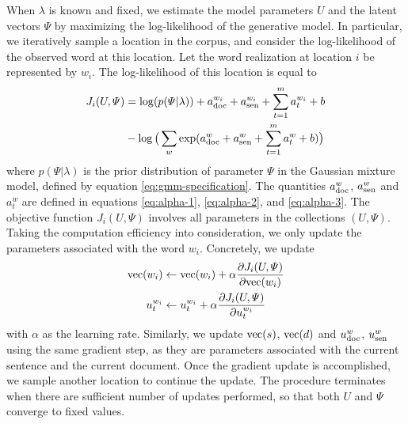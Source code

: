 \documentclass[english,letter]{article}
\renewcommand\[{\begin{equation}}
\renewcommand\]{\end{equation}}
\begin{document}
When $\lambda$ is known and fixed, we estimate the model parameters
$U$ and the latent vectors $\varPsi$ by maximizing the log-likelihood
of the generative model. In particular, we iteratively sample a location
in the corpus, and consider the log-likelihood of the observed word
at this location. Let the word realization at location $i$ be represented
by $w_{i}$. The log-likelihood of this location is equal to
\begin{align}
J_{i}(U,\varPsi) & =\log(p(\varPsi|\lambda))+a_{{\rm doc}}^{w_{i}}+a_{{\rm sen}}^{w_{i}}+\sum_{t=1}^{m}a_{t}^{w_{i}}+b\nonumber \\
 & -\log\big(\sum_{w}\exp(a_{{\rm doc}}^{w}+a_{{\rm sen}}^{w}+\sum_{t=1}^{m}a_{t}^{w}+b)\big)
\end{align}
where $p(\varPsi|\lambda)$ is the prior distribution of parameter
$\varPsi$ in the Gaussian mixture model, defined by equation \eqref{eq:gmm-specification}.
The quantities $a_{{\rm doc}}^{w}$, $a_{{\rm sen}}^{w}$ and $a_{t}^{w}$
are defined in equations \eqref{eq:alpha-1}, \eqref{eq:alpha-2},
and \eqref{eq:alpha-3}. The objective function $J_{i}(U,\varPsi)$
involves all parameters in the collections $(U,\varPsi)$. Taking
the computation efficiency into consideration, we only update the
parameters associated with the word $w_{i}$. Concretely, we update
\begin{align}
{\rm vec}(w_{i}) & \leftarrow{\rm vec}(w_{i})+\alpha\frac{\partial J_{i}(U,\varPsi)}{\partial{\rm vec}(w_{i})}\\
u_{t}^{w_{i}} & \leftarrow u_{t}^{w_{i}}+\alpha\frac{\partial J_{i}(U,\varPsi)}{\partial u_{t}^{w_{i}}}
\end{align}
with $\alpha$ as the learning rate. Similarly, we update ${\rm vec}(s)$,
${\rm vec}(d)$ and $u_{{\rm doc}}^{w}$, $u_{{\rm sen}}^{w}$ using
the same gradient step, as they are parameters associated with the
current sentence and the current document. Once the gradient update
is accomplished, we sample another location to continue the update.
The procedure terminates when there are sufficient number of updates
performed, so that both $U$ and $\varPsi$ converge to fixed values.
\end{document}
